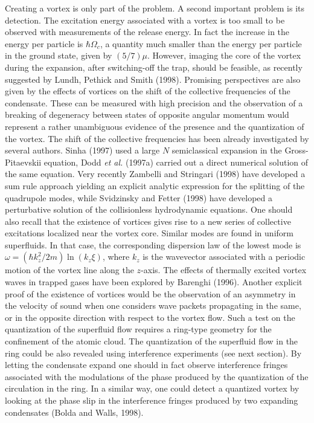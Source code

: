 Creating a vortex is only part of the problem. A second important
problem is its detection. The excitation energy associated with a vortex
is too small to be observed with measurements of the release energy. In
fact the increase in  the energy per particle is $\hbar \Omega_c$, 
a quantity much smaller than the energy per particle in the ground state, 
given by  $(5/7)\mu$. However, imaging the core of the vortex during the
expansion, after switching-off the trap, should be feasible, as recently
suggested by Lundh, Pethick and Smith (1998).   Promising 
perspectives are also given by the effects of vortices on the shift of 
the collective frequencies of the condensate. These  can be measured
with  high precision and the observation of a breaking of degeneracy 
between states of opposite angular momentum would represent a rather 
unambiguous evidence of the presence and the quantization of the 
vortex.  The shift of the collective frequencies has been already
investigated by several authors.  Sinha (1997) used a large $N$
semiclassical expansion in the Gross-Pitaevskii equation, Dodd {\it et
al.} (1997a) carried out a direct numerical  solution of
the same  equation. Very recently Zambelli and Stringari (1998) 
have developed a sum rule approach yielding an explicit analytic 
expression for the splitting of the quadrupole modes, while 
Svidzinsky and Fetter (1998) have developed a perturbative 
solution of the collisionless hydrodynamic equations.  One should also
recall that the existence of vortices gives rise to a new series of
collective excitations localized near the vortex core. Similar modes
are found in uniform superfluids. In that case, the corresponding
dispersion law of the lowest mode is $\omega = (\hbar k_z^2/2m)
\ln (k_z\xi )$, where $k_z$ is the wavevector associated with a 
periodic motion of the vortex line along the $z$-axis.  The effects 
of thermally excited vortex waves in trapped gases have been 
explored by Barenghi (1996). Another explicit proof of the
existence of vortices would be the observation of an asymmetry in
the velocity of sound when one considers wave packets propagating 
in the same, or in the opposite direction with respect to the vortex
flow. Such a test on the quantization of the superfluid flow requires
a ring-type geometry for the confinement of the atomic cloud.
The quantization of the superfluid flow  in the ring could be  also
revealed using interference experiments (see next section). By letting
the condensate expand one should in fact observe  interference
fringes associated with the modulations of the phase produced by
the quantization of the circulation in the ring. In a similar way,
one could detect a quantized vortex by looking at the phase slip in 
the interference fringes produced by two expanding condensates (Bolda 
and Walls, 1998).

